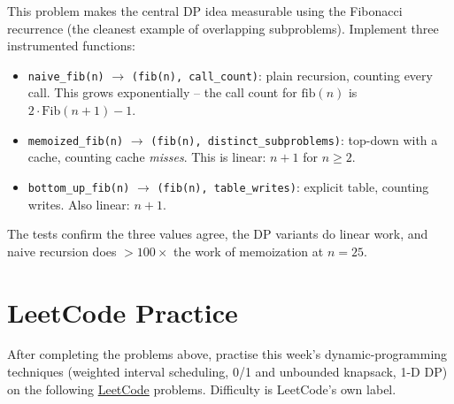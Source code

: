 \documentclass[11pt]{article}
\begin{document}
This problem makes the central DP idea measurable using the Fibonacci recurrence (the
cleanest example of overlapping subproblems). Implement three instrumented functions:
\begin{itemize}
    \item \texttt{naive\_fib(n)} $\to$ \texttt{(fib(n), call\_count)}: plain recursion,
    counting every call. This grows exponentially -- the call count for $\mathrm{fib}(n)$
    is $2 \cdot \mathrm{Fib}(n{+}1) - 1$.
    \item \texttt{memoized\_fib(n)} $\to$ \texttt{(fib(n), distinct\_subproblems)}:
    top-down with a cache, counting cache \emph{misses}. This is linear: $n+1$ for $n \ge
    2$.
    \item \texttt{bottom\_up\_fib(n)} $\to$ \texttt{(fib(n), table\_writes)}: explicit
    table, counting writes. Also linear: $n+1$.
\end{itemize}
The tests confirm the three values agree, the DP variants do linear work, and naive
recursion does $> 100\times$ the work of memoization at $n = 25$.

\newpage
\section{LeetCode Practice}

After completing the problems above, practise this week's dynamic-programming techniques
(weighted interval scheduling, 0/1 and unbounded knapsack, 1-D DP) on the following
\href{https://leetcode.com}{LeetCode} problems. Difficulty is LeetCode's own label.
\end{document}
